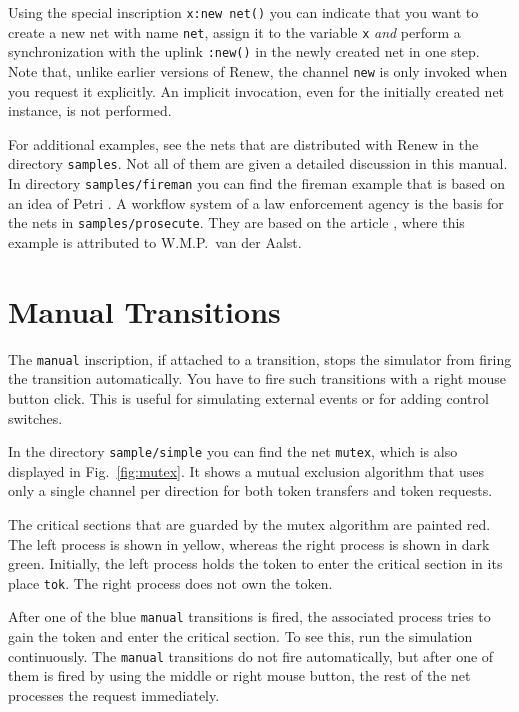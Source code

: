 Using the special inscription \texttt{x:new net()} you can
indicate that you want to create a new net with name \texttt{net},
assign it to the variable \texttt{x} \emph{and} perform a
synchronization with the uplink \texttt{:new()} in the newly
created net in one step. Note that, unlike earlier versions
of Renew, the channel \texttt{new} is only invoked when you
request it explicitly. An implicit invocation, even for the
initially created net instance, is not performed.

For additional examples, see the nets that are distributed with Renew
in the directory \texttt{samples}. Not all of them are given a
detailed discussion in this manual.
In directory \texttt{samples/fireman} you can find the fireman example
that is based on an idea of Petri \cite{petri80}.
A workflow system of a law enforcement agency
is the basis for the nets in \texttt{samples/prosecute}.
They are based on the article \cite{valk98}, where this example
is attributed to W.M.P.~van der Aalst.


\section{Manual Transitions}

The \texttt{manual} inscription, if attached to a transition,
stops the simulator from firing the transition automatically.
You have to fire such transitions with
a right mouse button click. This is useful for simulating external
events or for adding control switches.

In the directory \texttt{sample/simple} you can find the net
\texttt{mutex}, which is also displayed in Fig.~\ref{fig:mutex}.
It shows a mutual exclusion algorithm that uses only a single
channel per direction for both token transfers and token requests.


The critical sections that are guarded by the mutex algorithm
are painted red. The left process is shown in yellow, whereas
the right process is shown in dark green.
Initially, the left process holds the token to enter
the critical section in its place \texttt{tok}. The right
process does not own the token.

After one of the blue \texttt{manual} transitions is fired,
the associated process tries to gain the token and enter the
critical section. To see this, run the simulation continuously.
The \texttt{manual} transitions do not fire automatically,
but after one of them is fired by using the middle or right mouse button,
the rest of the net processes the request immediately.


